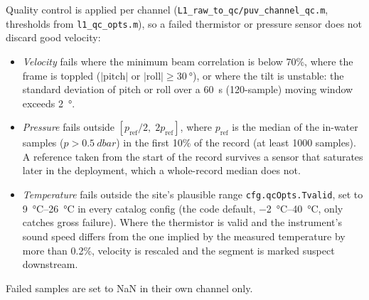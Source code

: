 Quality control is applied per channel (\texttt{L1\_raw\_to\_qc/puv\_channel\_qc.m},
thresholds from \texttt{l1\_qc\_opts.m}), so a failed thermistor or pressure
sensor does not discard good velocity:
\begin{itemize}
  \item \emph{Velocity} fails where the minimum beam correlation is below 70\%,
    where the frame is toppled ($|\text{pitch}|$ or $|\text{roll}| \ge
    \SI{30}{\degree}$), or where the tilt is unstable: the standard deviation of
    pitch or roll over a \SI{60}{\second} (120-sample) moving window exceeds
    \SI{2}{\degree}.
  \item \emph{Pressure} fails outside $[p_\text{ref}/2,\; 2p_\text{ref}]$, where
    $p_\text{ref}$ is the median of the in-water samples ($p > \SI{0.5}{dbar}$) in
    the first 10\% of the record (at least 1000 samples). A reference taken from
    the start of the record survives a sensor that saturates later in the
    deployment, which a whole-record median does not.
  \item \emph{Temperature} fails outside the site's plausible range
    \texttt{cfg.qcOpts.Tvalid}, set to \SIrange{9}{26}{\celsius} in every catalog
    config (the code default, \SIrange{-2}{40}{\celsius}, only catches gross
    failure). Where the thermistor is valid and the instrument's sound speed
    differs from the one implied by the measured temperature by more than 0.2\%,
    velocity is rescaled and the segment is marked suspect downstream.
\end{itemize}
Failed samples are set to NaN in their own channel only.


